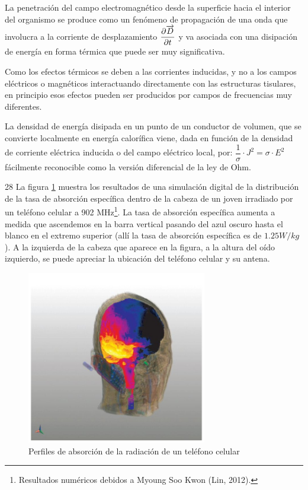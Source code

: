 La penetración del campo electromagnético desde la superficie hacia el interior del organismo se produce como un fenómeno de propagación de una onda que involucra a la corriente de desplazamiento $\dfrac{\partial \overrightarrow{D}}{\partial t}$ y va asociada con una disipación de energía en forma térmica que puede ser muy significativa.

Como los efectos térmicos se deben a las corrientes inducidas, y no a los campos eléctricos o magnéticos interactuando directamente con las estructuras tisulares, en principio esos efectos pueden ser producidos por campos de frecuencias muy diferentes.

La densidad de energía disipada en un punto de un conductor de volumen, que se convierte localmente en energía calorífica viene, dada en función de la densidad de corriente eléctrica inducida o del campo eléctrico local, por: $\dfrac{1}{\sigma} \cdot J^{2}= \sigma\cdot E^{2}$ fácilmente reconocible como la versión diferencial de la ley de Ohm.

28
La figura \ref{fig:68} muestra los resultados de una simulación digital de la distribución de la tasa de absorción específica dentro de la cabeza de un joven irradiado por un teléfono celular a 902 MHz\footnote{Resultados numéricos debidos a Myoung Soo Kwon (Lin, 2012).}. La tasa de absorción específica aumenta a medida que ascendemos en la barra vertical pasando del azul oscuro hasta el blanco en el extremo superior (allí la tasa de absorción específica es de $1.25 W/kg$).
A la izquierda de la cabeza que aparece en la figura, a la altura del oído izquierdo, se puede apreciar la ubicación del teléfono celular y su antena.

\begin{figure}[H]
    \centering
    \includegraphics[width=0.7\textwidth]{./Figures/fig68}
	\caption{Perfiles de absorción de la radiación de un teléfono celular}
	\label{fig:68}
\end{figure}

